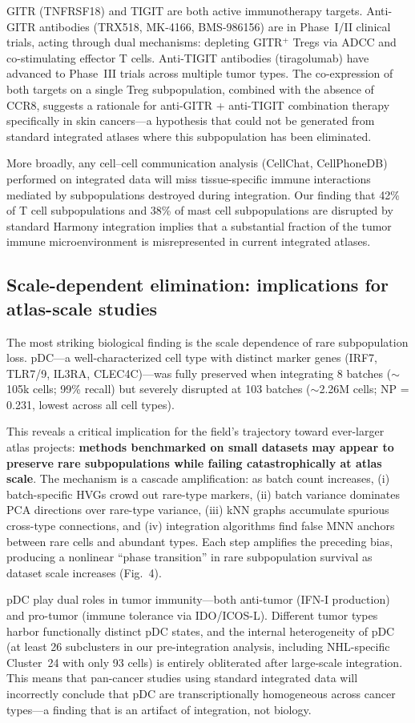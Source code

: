 GITR (TNFRSF18) and TIGIT are both active immunotherapy targets. Anti-GITR antibodies (TRX518, MK-4166, BMS-986156) are in Phase~I/II clinical trials, acting through dual mechanisms: depleting GITR$^+$ Tregs via ADCC and co-stimulating effector T cells. Anti-TIGIT antibodies (tiragolumab) have advanced to Phase~III trials across multiple tumor types. The co-expression of both targets on a single Treg subpopulation, combined with the absence of CCR8, suggests a rationale for anti-GITR + anti-TIGIT combination therapy specifically in skin cancers---a hypothesis that could not be generated from standard integrated atlases where this subpopulation has been eliminated.

More broadly, any cell--cell communication analysis (CellChat, CellPhoneDB) performed on integrated data will miss tissue-specific immune interactions mediated by subpopulations destroyed during integration. Our finding that 42\% of T cell subpopulations and 38\% of mast cell subpopulations are disrupted by standard Harmony integration implies that a substantial fraction of the tumor immune microenvironment is misrepresented in current integrated atlases.

\subsection*{Scale-dependent elimination: implications for atlas-scale studies}

The most striking biological finding is the scale dependence of rare subpopulation loss. pDC---a well-characterized cell type with distinct marker genes (IRF7, TLR7/9, IL3RA, CLEC4C)---was fully preserved when integrating 8 batches ($\sim$105k cells; 99\% recall) but severely disrupted at 103 batches ($\sim$2.26M cells; NP = 0.231, lowest across all cell types).

This reveals a critical implication for the field's trajectory toward ever-larger atlas projects: \textbf{methods benchmarked on small datasets may appear to preserve rare subpopulations while failing catastrophically at atlas scale}. The mechanism is a cascade amplification: as batch count increases, (i) batch-specific HVGs crowd out rare-type markers, (ii) batch variance dominates PCA directions over rare-type variance, (iii) kNN graphs accumulate spurious cross-type connections, and (iv) integration algorithms find false MNN anchors between rare cells and abundant types. Each step amplifies the preceding bias, producing a nonlinear ``phase transition'' in rare subpopulation survival as dataset scale increases (Fig.~4).

pDC play dual roles in tumor immunity---both anti-tumor (IFN-I production) and pro-tumor (immune tolerance via IDO/ICOS-L). Different tumor types harbor functionally distinct pDC states, and the internal heterogeneity of pDC (at least 26 subclusters in our pre-integration analysis, including NHL-specific Cluster~24 with only 93 cells) is entirely obliterated after large-scale integration. This means that pan-cancer studies using standard integrated data will incorrectly conclude that pDC are transcriptionally homogeneous across cancer types---a finding that is an artifact of integration, not biology.

